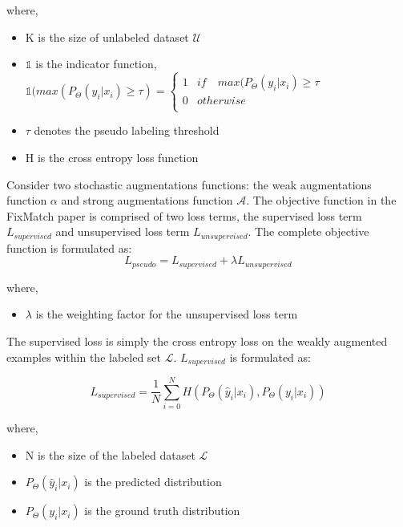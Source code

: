 where,
\begin{itemize}[label={}]
  \setlength\itemsep{0em}
  \item K is the size of unlabeled dataset $\mathcal{U}$
  \item $\mathbb{1}$ is the indicator function, $\mathbb{1}(max(P_{\Theta}(y_i | x_i) \geq \tau) = \begin{cases} 
      1 & if \quad max(P_{\Theta}(y_i | x_i) \geq \tau \\
      0 & otherwise \\
   \end{cases}$ 
   \item $\tau$ denotes the pseudo labeling threshold 
   \item H is the cross entropy loss function
\end{itemize}
Consider two stochastic augmentations functions: the weak augmentations function $\alpha$ and strong augmentations function $\mathcal{A}$. The objective function in the FixMatch paper is comprised of two loss terms, the supervised loss term $L_{supervised}$ and unsupervised loss term $L_{unsupervised}$. The complete objective function is formulated as:
\begin{equation}
    \label{equation:fixmatch_loss}
    L_{pseudo} = L_{supervised} + \lambda L_{unsupervised}
\end{equation}

where,
\begin{itemize}[label={}]
  \setlength\itemsep{0em}
  \item $\lambda$ is the weighting factor for the unsupervised loss term
\end{itemize}

The supervised loss is simply the cross entropy loss on the weakly augmented examples within the labeled set $\mathcal{L}$. $L_{supervised}$ is formulated as:

\begin{equation}
    \label{equation:fixmatch_supervised_loss}
    L_{supervised} = \frac{1}{N} \sum_{i=0}^{N} H(P_{\Theta}(\hat{y}_i | x_i), P_{\Theta}(y_i | x_i))
\end{equation}

where,
\begin{itemize}[label={}]
  \setlength\itemsep{0em}
  \item N is the size of the labeled dataset $\mathcal{L}$
  \item $P_{\Theta}(\hat{y}_i | x_i)$ is the predicted distribution
  \item $P_{\Theta}(y_i | x_i)$ is the ground truth distribution
\end{itemize}

